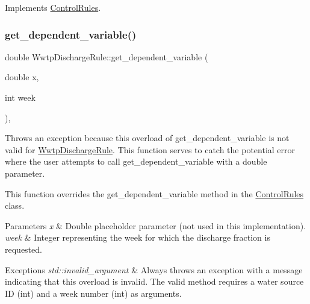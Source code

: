 Implements \mbox{\hyperlink{classControlRules}{Control\+Rules}}.

\mbox{\label{classWwtpDischargeRule_a10eb6f901b6479dadc107e0a7c07e03b}} 
\subsubsection{\texorpdfstring{get\+\_\+dependent\+\_\+variable()}{get\_dependent\_variable()}\hspace{0.1cm}{\footnotesize\ttfamily [3/4]}}
{\footnotesize\ttfamily double Wwtp\+Discharge\+Rule\+::get\+\_\+dependent\+\_\+variable (\begin{DoxyParamCaption}\item[{double}]{x,  }\item[{int}]{week }\end{DoxyParamCaption})\hspace{0.3cm}{\ttfamily [override]}, {\ttfamily [virtual]}}



Throws an exception because this overload of {\ttfamily get\+\_\+dependent\+\_\+variable} is not valid for {\ttfamily \mbox{\hyperlink{classWwtpDischargeRule}{Wwtp\+Discharge\+Rule}}}. This function serves to catch the potential error where the user attempts to call {\ttfamily get\+\_\+dependent\+\_\+variable} with a double parameter. 

This function overrides the {\ttfamily get\+\_\+dependent\+\_\+variable} method in the {\ttfamily \mbox{\hyperlink{classControlRules}{Control\+Rules}}} class.


\begin{DoxyParams}{Parameters}
{\em x} & Double placeholder parameter (not used in this implementation). \\
\hline
{\em week} & Integer representing the week for which the discharge fraction is requested.\\
\hline
\end{DoxyParams}

\begin{DoxyExceptions}{Exceptions}
{\em std\+::invalid\+\_\+argument} & Always throws an exception with a message indicating that this overload is invalid. The valid method requires a water source ID (int) and a week number (int) as arguments. \\
\hline
\end{DoxyExceptions}


